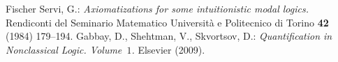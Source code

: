 \documentclass[draft]{article}
\begin{document}
\begin{thebibliography}{}
%
%
%
%
%
%
%
%
%
%
%
%
%
%
%
%
%
%
%
%
%
%
%
%
Fischer Servi, G.:
{\it Axiomatizations for some intuitionistic modal logics.}
Rendiconti del Seminario Matematico Universit\`a e Politecnico di Torino {\bf 42} (1984) 179--194.
%
%
%
%
%
%
Gabbay, D., Shehtman, V., Skvortsov, D.:
{\it Quantification in Nonclassical Logic. Volume~$1$.}
Elsevier (2009).
%
%

\end{thebibliography}
\end{document}
